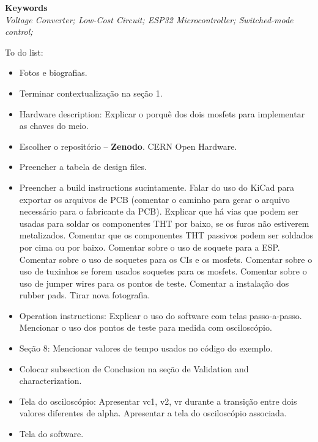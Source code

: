 \documentclass[11pt, letterpaper]{article}
\newcommand{\red}[1]{{\color{red}#1}}
\begin{document}
\begin{flushleft}
  \textbf{Keywords}\\ \textit{Voltage Converter; Low-Cost Circuit; ESP32 Microcontroller; Switched-mode control;}

  \red{To do list:
    \begin{itemize}
      \item Fotos e biografias.
      \item Terminar contextualização na seção 1.
      \item Hardware description: Explicar o porquê dos dois mosfets para implementar as chaves do meio.
      \item Escolher o repositório -- \textbf{Zenodo}. CERN Open Hardware.
      \item Preencher a tabela de design files.
      \item Preencher a build instructions sucintamente. Falar do uso do KiCad para exportar os arquivos de PCB (comentar o caminho para gerar o arquivo necessário para o fabricante da PCB). Explicar que há vias que podem ser usadas para soldar os componentes THT por baixo, se os furos não estiverem metalizados. Comentar que os componentes THT passivos podem ser soldados por cima ou por baixo. Comentar sobre o uso de soquete para a ESP. Comentar sobre o uso de soquetes para os CIs e os mosfets. Comentar sobre o uso de tuxinhos se forem usados soquetes para os mosfets. Comentar sobre o uso de jumper wires para os pontos de teste. Comentar a instalação dos rubber pads. Tirar nova fotografia.
      \item Operation instructions: Explicar o uso do software com telas passo-a-passo. Mencionar o uso dos pontos de teste para medida com osciloscópio.
      \item Seção 8: \red{Mencionar valores de tempo usados no código do exemplo.}
      \item Colocar subsection de Conclusion na seção de Validation and characterization.
      \item Tela do osciloscópio:  Apresentar vc1, v2, vr durante a transição entre dois valores diferentes de alpha. Apresentar a tela do osciloscópio associada.
      \item Tela do software.
    \end{itemize}
  }



\end{flushleft}
\end{document}
